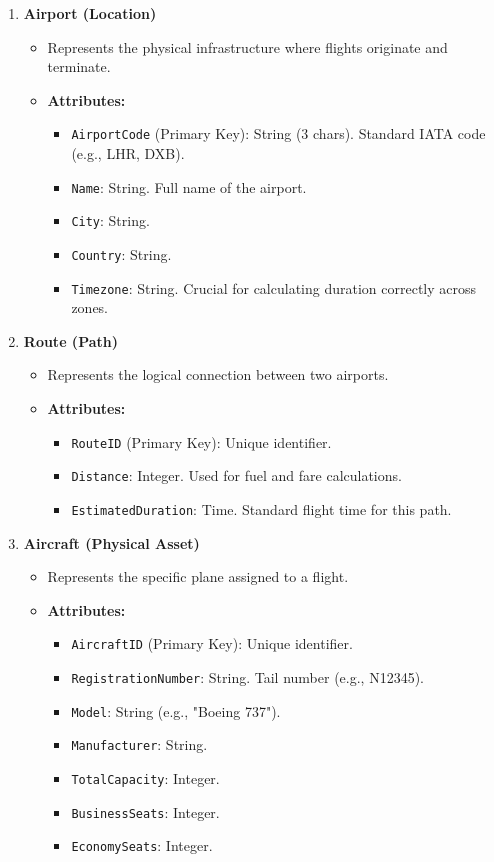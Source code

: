 \documentclass[12pt, a4paper]{article}
\begin{document}
\begin{enumerate}
		\item \textbf{Airport (Location)}
		\begin{itemize}
			\item Represents the physical infrastructure where flights originate and terminate.
			\item \textbf{Attributes:}
			\begin{itemize}
				\item \texttt{AirportCode} (Primary Key): String (3 chars). Standard IATA code (e.g., LHR, DXB).
				\item \texttt{Name}: String. Full name of the airport.
				\item \texttt{City}: String.
				\item \texttt{Country}: String.
				\item \texttt{Timezone}: String. Crucial for calculating duration correctly across zones.
			\end{itemize}
		\end{itemize}
		
		\item \textbf{Route (Path)}
		\begin{itemize}
			\item Represents the logical connection between two airports.
			\item \textbf{Attributes:}
			\begin{itemize}
				\item \texttt{RouteID} (Primary Key): Unique identifier.
				\item \texttt{Distance}: Integer. Used for fuel and fare calculations.
				\item \texttt{EstimatedDuration}: Time. Standard flight time for this path.
			\end{itemize}
		\end{itemize}
		
		\item \textbf{Aircraft (Physical Asset)}
		\begin{itemize}
			\item Represents the specific plane assigned to a flight.
			\item \textbf{Attributes:}
			\begin{itemize}
				\item \texttt{AircraftID} (Primary Key): Unique identifier.
				\item \texttt{RegistrationNumber}: String. Tail number (e.g., N12345).
				\item \texttt{Model}: String (e.g., "Boeing 737").
				\item \texttt{Manufacturer}: String.
				\item \texttt{TotalCapacity}: Integer.
				\item \texttt{BusinessSeats}: Integer.
				\item \texttt{EconomySeats}: Integer.
			\end{itemize}
		\end{itemize}
		

\end{enumerate}
\end{document}
